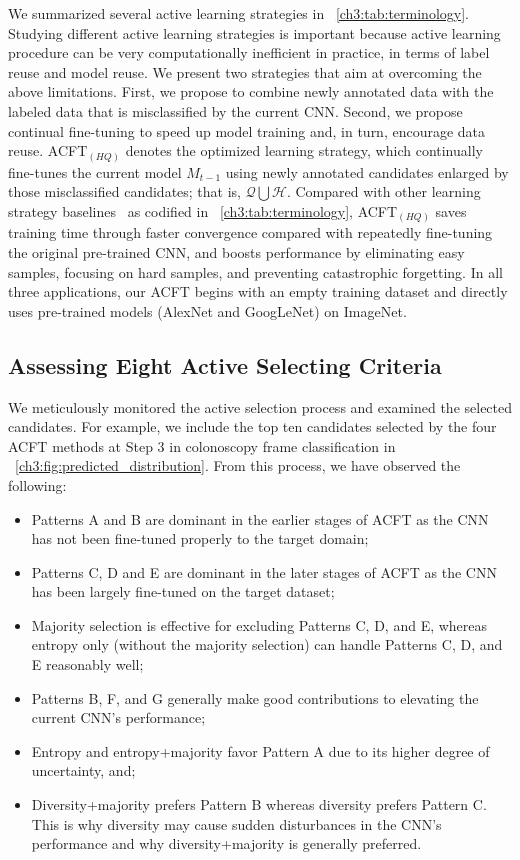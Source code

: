 We summarized several active learning strategies in \tableautorefname~\ref{ch3:tab:terminology}. Studying different active learning strategies is important because active learning procedure can be very computationally inefficient in practice, in terms of label reuse and model reuse. We present two strategies that aim at overcoming the above limitations. First, we propose to combine newly annotated data with the labeled data that is misclassified by the current CNN. Second, we propose continual fine-tuning to speed up model training and, in turn, encourage data reuse.
ACFT$_{(HQ)}$ denotes the optimized learning strategy, which continually fine-tunes the current model $M_{t-1}$ using newly annotated candidates enlarged by those misclassified candidates; that is, $\mathcal{Q}\bigcup\mathcal{H}$. 
Compared with other learning strategy baselines~\citep{tajbakhsh2016convolutional, zhou2017fine,zhou2019integrating} as codified in \tableautorefname~\ref{ch3:tab:terminology}, ACFT$_{(HQ)}$ saves training time through faster convergence compared with repeatedly fine-tuning the original pre-trained CNN, and boosts performance by eliminating easy samples, focusing on hard samples, and preventing catastrophic forgetting. In all three applications, our ACFT begins with an empty training dataset and directly uses pre-trained models (AlexNet and GoogLeNet) on ImageNet.


\subsection{Assessing Eight Active Selecting Criteria}
\label{ch3:experiment_result:assessing_eight_active_selecting_criteria}

We meticulously monitored the active selection process and examined the selected candidates. For example, we include the top ten candidates selected by the four ACFT methods at Step 3 in colonoscopy frame classification in \figurename~\ref{ch3:fig:predicted_distribution}. From this process, we have observed the following:
\begin{itemize}
\item Patterns A and B are dominant in the earlier stages of ACFT as the CNN has not been fine-tuned properly to the target domain;
\item Patterns C, D and E are dominant in the later stages of ACFT as the CNN has been largely fine-tuned on the target dataset;
\item Majority selection is effective for excluding Patterns C, D, and E, whereas entropy only (without the majority selection) can handle Patterns C, D, and E reasonably well;
\item Patterns B, F, and G generally make good contributions to elevating the current CNN's performance;
\item Entropy and entropy+majority favor Pattern A due to its higher degree of uncertainty, and;
\item Diversity+majority prefers Pattern B whereas diversity prefers Pattern C. This is why diversity may cause sudden disturbances in the CNN's performance and why diversity+majority is generally preferred.

\end{itemize}

